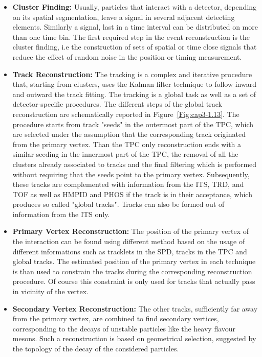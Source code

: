 \begin{itemize}
\item \textbf{Cluster Finding:} Usually, particles that interact with a detector, depending on its spatial segmentation, leave a signal in several adjacent detecting elements. Similarly a signal, last in a time interval can be distributed on more than one time bin. The first required step in the event reconstruction is the cluster finding, i.e  the construction of sets of spatial or time close signals that reduce the effect of random noise in the position or timing measurement.

\item \textbf{Track Reconstruction:} The tracking is a complex and iterative procedure that, starting from clusters, uses the Kalman filter technique to follow inward and outward the track fitting. The tracking is a global task as well as a set of detector-specific procedures. The different steps of the global track reconstruction are schematically reported in \mbox{Figure \ref{Fig:cap3-1.13}}. The procedure starts from track "seeds" in the outermost part of the TPC, which are selected under the assumption that the corresponding track originated from the primary vertex. Than the TPC only reconstruction ends with a similar seeding in the innermost part of the TPC, the removal of all the clusters already associated to tracks and the final filtering which is performed without requiring that the seeds point to the primary vertex. Subsequently, these tracks are complemented with information from the ITS, TRD, and TOF as well as HMPID and PHOS if the track is in their acceptance, which produces so called "global tracks". Tracks can also be formed out of information from the ITS only.

\item \textbf{Primary Vertex Reconstruction:} The position of the primary vertex of the interaction can be found using different method based on the usage of different informations such as tracklets in the SPD, tracks in the TPC and global tracks. The estimated position of the primary vertex in each technique is than used to constrain the tracks during the corresponding reconstruction procedure. Of course this constraint is only used for tracks that actually pass in vicinity of the vertex.

\item \textbf{Secondary Vertex Reconstruction:} The other tracks, sufficiently far away from the primary vertex, are combined to find secondary vertices, corresponding to the decays of unstable particles like the heavy flavour mesons. Such a reconstruction is based on geometrical selection, suggested by the topology of the decay of the considered particles.
\end{itemize}

